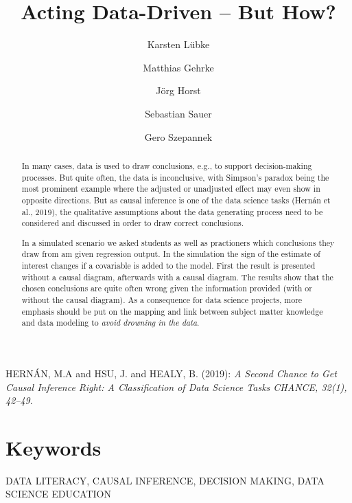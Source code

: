 \documentclass{svmult}
\begin{document}
\title*{Acting Data-Driven -- But How?}

\author{Karsten L\"{u}bke\and
Matthias Gehrke\and
J\"{o}rg Horst\and
Sebastian Sauer \and
Gero Szepannek}

\maketitle

\begin{abstract}
In many cases, data is used to draw conclusions, e.g., to support decision-making processes.
But quite often, the data is inconclusive, with Simpson's paradox being the most prominent example where the adjusted or unadjusted effect may even show in opposite directions.
But as causal inference is one of the data science tasks (Hern\'{a}n et al., 2019), the qualitative assumptions about the data generating process need to be considered and discussed in order to draw correct conclusions.

In a simulated scenario we asked students as well as practioners which conclusions they draw from am given regression output. In the simulation the sign of the estimate of interest changes if a covariable is added to the model.
First the result is presented without a causal diagram, afterwards with a causal diagram. 
The results show that the chosen conclusions are quite often wrong given the information provided (with or without the causal diagram). 
As a consequence for data science projects, more emphasis should be put on the mapping and link between subject matter knowledge and data modeling to {\em avoid drowning in the data}.


\end{abstract}

\begin{thebibliography}{1}

\item[]
HERN\'{A}N, M.A and HSU, J. and  HEALY, B. (2019): {\em A Second Chance to Get
Causal Inference Right: A Classification of Data Science Tasks CHANCE, 32(1), 42--49}. 

\end{thebibliography}

\section*{Keywords}
DATA LITERACY, CAUSAL INFERENCE, DECISION MAKING, DATA SCIENCE EDUCATION 
\end{document}
